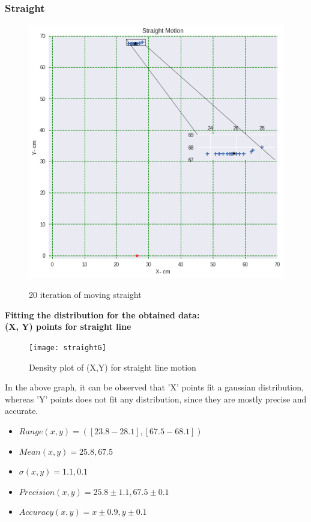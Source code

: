 \documentclass[11pt,a4paper]{article}
\begin{document}
\begin{itemize}
		\subsubsection{Straight}
		\begin{figure}[H]
			\centering	
			\includegraphics[width=1.2\linewidth]{Straight}
			\label{fig:straight}
			\caption{20 iteration of moving straight}
		\end{figure}
		
		\newpage
		\textbf{Fitting the distribution for the obtained data: \\ (X, Y) points for straight line}
		\begin{figure}[H]
			\centering	
			\texttt{[image: straightG]}
			\label{fig:straightG}
			\caption{Density plot of (X,Y) for straight line motion}
		\end{figure}
		
		In the above graph, it can be observed that 'X' points fit a gaussian distribution, whereas 'Y' points does not fit any distribution, since they are mostly precise and accurate.
		\begin{itemize}
			\item $ Range (x,y) =([23.8-28.1],[67.5-68.1]) $
			\item $ Mean (x, y) = 25.8,67.5$
			\item $ \sigma (x, y)= 1.1, 0.1 $
			\item $ Precision (x, y)= 25.8 \pm 1.1, 67.5 \pm 0.1  $
			\item $ Accuracy (x,y) = x \pm0.9  , y \pm0.1 $  
		\end{itemize}
		

\end{itemize}
\end{document}
